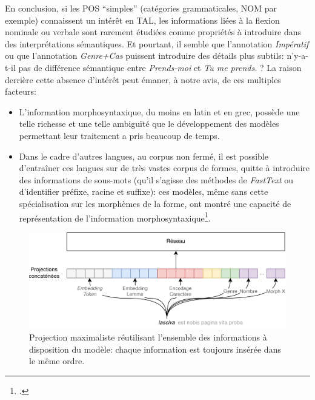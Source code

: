 En conclusion, si les POS \enquote{simples} (catégories grammaticales, NOM par exemple) connaissent un intérêt en TAL, les informations liées à la flexion nominale ou verbale sont rarement étudiées comme propriétés à introduire dans des interprétations sémantiques. Et pourtant, il semble que l'annotation \textit{Impératif} ou que l'annotation \textit{Genre+Cas} puissent introduire des détails plus subtils: n'y-a-t-il pas de différence sémantique entre \textit{Prends-moi} et \textit{Tu me prends.} ? La raison derrière cette absence d'intérêt peut émaner, à notre avis, de ces multiples facteurs:
\begin{itemize}
    \item L'information morphosyntaxique, du moins en latin et en grec, possède une telle richesse et une telle ambiguïté que le développement des modèles permettant leur traitement a pris beaucoup de temps.
    \item Dans le cadre d'autres langues, au corpus non fermé, il est possible d'entraîner ces langues sur de très vastes corpus de formes, quitte à introduire des informations de sous-mots (qu'il s'agisse des méthodes de \textit{FastText} ou d'identifier préfixe, racine et suffixe): ces modèles, même sans cette spécialisation sur les morphèmes de la forme, ont montré une capacité de représentation de l'information morphosyntaxique\footcite{qian_investigating_2016}.%
    
\end{itemize}


\begin{figure}
    \centering
    \includegraphics[width=\linewidth]{figures/chap4/Projection.drawio.png}
    \caption{Projection maximaliste réutilisant l'ensemble des informations à disposition du modèle: chaque information est toujours insérée dans le même ordre.}
    \label{fig:chap4:projection:morphosyntax}
\end{figure}


